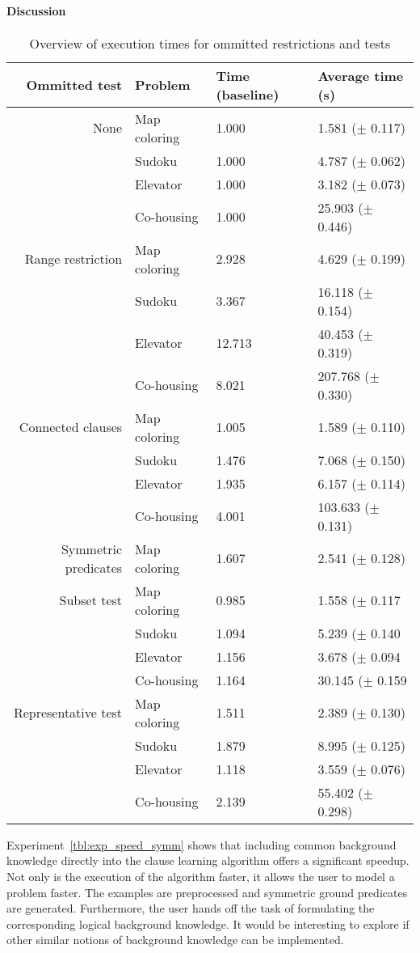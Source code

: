 \paragraph{Discussion}
\begin{table}
	\begin{tabularx}{\textwidth}{rl|XX}
\textbf{Ommitted test}	& \textbf{Problem} 		& \textbf{Time (baseline)}	& \textbf{Average time (s)}\\
\toprule
None 					& Map coloring 	& 1.000 	& 1.581		($\pm$ 0.117)\\
						& Sudoku 		& 1.000 	& 4.787		($\pm$ 0.062)\\
						& Elevator 		& 1.000 	& 3.182 	($\pm$ 0.073)\\
						& Co-housing 	& 1.000 	& 25.903	($\pm$ 0.446)\\
\midrule
Range restriction 		& Map coloring 	& 2.928		& 4.629		($\pm$ 0.199)\\
						& Sudoku 		& 3.367		& 16.118	($\pm$ 0.154)\\
						& Elevator 		& 12.713	& 40.453 	($\pm$ 0.319)\\
						& Co-housing 	& 8.021		& 207.768	($\pm$ 0.330)\\
\midrule
Connected clauses 		& Map coloring 	& 1.005		& 1.589		($\pm$ 0.110)\\
						& Sudoku 		& 1.476		& 7.068		($\pm$ 0.150)\\
						& Elevator 		& 1.935		& 6.157 	($\pm$ 0.114)\\
						& Co-housing 	& 4.001		& 103.633	($\pm$ 0.131)\\
\midrule
Symmetric predicates	& Map coloring 	& 1.607		& 2.541		($\pm$ 0.128)\\
\midrule
Subset test 			& Map coloring 	& 0.985		& 1.558		($\pm$ 0.117\\
						& Sudoku 		& 1.094		& 5.239		($\pm$ 0.140\\
						& Elevator 		& 1.156		& 3.678 	($\pm$ 0.094\\
						& Co-housing 	& 1.164		& 30.145	($\pm$ 0.159\\
\midrule
Representative test 	& Map coloring 	& 1.511		& 2.389		($\pm$ 0.130)\\
						& Sudoku 		& 1.879		& 8.995		($\pm$ 0.125)\\
						& Elevator 		& 1.118		& 3.559 	($\pm$ 0.076)\\
						& Co-housing 	& 2.139		& 55.402	($\pm$ 0.298)\\
	\end{tabularx}
	\caption{Overview of execution times for ommitted restrictions and tests}
	\label{tbl:speed_results}
\end{table}
Experiment~\ref{tbl:exp_speed_symm} shows that including common background knowledge directly into the clause learning algorithm offers a significant speedup.
Not only is the execution of the algorithm faster, it allows the user to model a problem faster.
The examples are preprocessed and symmetric ground predicates are generated.
Furthermore, the user hands off the task of formulating the corresponding logical background knowledge.
It would be interesting to explore if other similar notions of background knowledge can be implemented.

